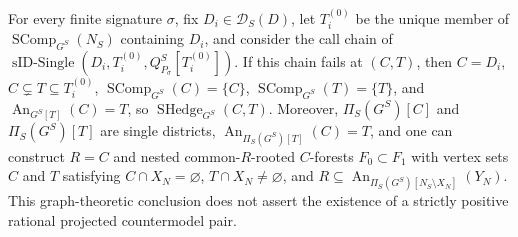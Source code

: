 For every finite signature \(\sigma\), fix \(D_i\in\mathcal D_S(D)\), let \(T_i^{(0)}\) be the unique member of \(\operatorname{SComp}_{G^S}(N_S)\) containing \(D_i\), and consider the call chain of \(\operatorname{sID\text{-}Single}(D_i,T_i^{(0)},Q_{P_\sigma}^S[T_i^{(0)}])\). If this chain fails at \((C,T)\), then \(C=D_i\), \(C\subsetneq T\subseteq T_i^{(0)}\), \(\operatorname{SComp}_{G^S}(C)=\{C\}\), \(\operatorname{SComp}_{G^S}(T)=\{T\}\), and \(\operatorname{An}_{G^S[T]}(C)=T\), so \(\operatorname{SHedge}_{G^S}(C,T)\). Moreover, \(\Pi_S(G^S)[C]\) and \(\Pi_S(G^S)[T]\) are single districts, \(\operatorname{An}_{\Pi_S(G^S)[T]}(C)=T\), and one can construct \(R=C\) and nested common-\(R\)-rooted \(C\)-forests \(F_0\subset F_1\) with vertex sets \(C\) and \(T\) satisfying \(C\cap X_N=\varnothing\), \(T\cap X_N\ne\varnothing\), and \(R\subseteq\operatorname{An}_{\Pi_S(G^S)[N_S\setminus X_N]}(Y_N)\). This graph-theoretic conclusion does not assert the existence of a strictly positive rational projected countermodel pair.